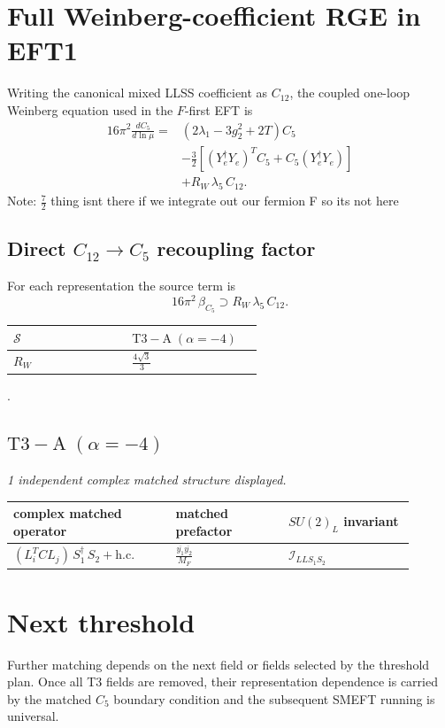 \documentclass[9pt]{article}
\begin{document}
\section*{Full Weinberg-coefficient RGE in EFT1}
Writing the canonical mixed LLSS coefficient as $C_{12}$, the coupled one-loop Weinberg equation used in the $F$-first EFT is
\begin{align}
16\pi^2\frac{dC_5}{d\ln\mu}={}&(2\lambda_1-3g_2^2+2T)C_5\\
&-\frac32\left[(Y_e^\dagger Y_e)^T C_5+C_5(Y_e^\dagger Y_e)\right]\\
&+R_W\,\lambda_5\,C_{12}.
\end{align}
Note: $\frac{7}{2}$ thing isnt there if we integrate out our fermion F so its not here \subsection*{Direct $C_{12}\to C_5$ recoupling factor}
For each representation the source term is
\[16\pi^2\,\beta_{C_5}\supset R_W\,\lambda_5\,C_{12}.\]
\begin{longtable}{@{}p{0.37\linewidth}p{0.19\linewidth}@{}}
\toprule
$\mathcal{S}$ & $ \mathrm{T3-A}\;(\alpha=-4) $ \\
\midrule
$R_W$ & $ \frac{4 \sqrt{3}}{3} $ \\
\bottomrule
\end{longtable}
.
\subsection*{$ \mathrm{T3-A}\;(\alpha=-4) $}
\textit{1 independent complex matched structure displayed. }
\begin{longtable}{@{}p{0.36\linewidth}p{0.25\linewidth}p{0.29\linewidth}@{}}
\toprule
complex matched operator & matched prefactor & $SU(2)_L$ invariant \\
\midrule
$ (L_i^T C L_j)\,S_1^\dagger\,S_2+\mathrm{h.c.} $ & $ \frac{\overline{y_{1}} \overline{y_{2}}}{M_F} $ & $ \mathcal{I}_{LLS_1S_2} $ \\
\bottomrule
\end{longtable}
\section*{Next threshold}
Further matching depends on the next field or fields selected by the threshold plan.  Once all T3 fields are removed, their representation dependence is carried by the matched $C_5$ boundary condition and the subsequent SMEFT running is universal.
\end{document}
